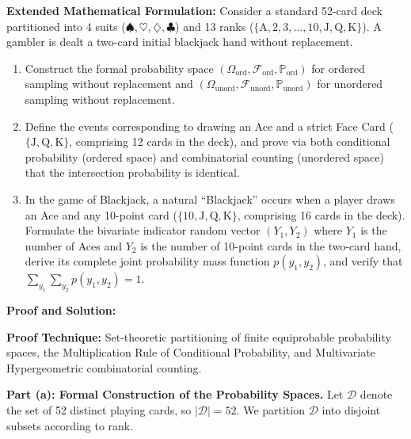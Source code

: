 \documentclass[11pt, letterpaper]{article}
\theoremstyle{definition}
\theoremstyle{remark}
\newcommand{\Prob}{\mathbb{P}}
\newcommand{\F}{\mathcal{F}}
\begin{document}
\textbf{Extended Mathematical Formulation:}
Consider a standard 52-card deck partitioned into 4 suits ($\spadesuit, \heartsuit, \diamondsuit, \clubsuit$) and 13 ranks ($\{\text{A}, 2, 3, \dots, 10, \text{J}, \text{Q}, \text{K}\}$). A gambler is dealt a two-card initial blackjack hand without replacement.
\begin{enumerate}[label=(\alph*)]
    \item Construct the formal probability space $(\Omega_{\text{ord}}, \F_{\text{ord}}, \Prob_{\text{ord}})$ for ordered sampling without replacement and $(\Omega_{\text{unord}}, \F_{\text{unord}}, \Prob_{\text{unord}})$ for unordered sampling without replacement.
    \item Define the events corresponding to drawing an Ace and a strict Face Card ($\{\text{J}, \text{Q}, \text{K}\}$, comprising 12 cards in the deck), and prove via both conditional probability (ordered space) and combinatorial counting (unordered space) that the intersection probability is identical.
    \item In the game of Blackjack, a natural ``Blackjack'' occurs when a player draws an Ace and any 10-point card ($\{10, \text{J}, \text{Q}, \text{K}\}$, comprising 16 cards in the deck). Formulate the bivariate indicator random vector $(Y_1, Y_2)$ where $Y_1$ is the number of Aces and $Y_2$ is the number of 10-point cards in the two-card hand, derive its complete joint probability mass function $p(y_1, y_2)$, and verify that $\sum_{y_1}\sum_{y_2} p(y_1, y_2) = 1$.
\end{enumerate}

\textbf{Proof and Solution:}

\textbf{Proof Technique:} Set-theoretic partitioning of finite equiprobable probability spaces, the Multiplication Rule of Conditional Probability, and Multivariate Hypergeometric combinatorial counting.

\textbf{Part (a): Formal Construction of the Probability Spaces.}
Let $\mathcal{D}$ denote the set of 52 distinct playing cards, so $|\mathcal{D}| = 52$. We partition $\mathcal{D}$ into disjoint subsets according to rank.
\end{document}
